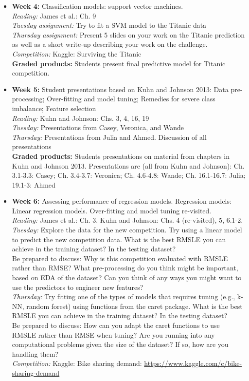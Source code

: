 \documentclass[11pt,oneside]{amsart}
\begin{document}
\begin{itemize}
\item \textbf{Week 4:} Classification models: support vector
  machines.\\
\emph{Reading:} James et al.: Ch. 9\\
\emph{Tuesday assignment:} Try to fit a SVM model to the Titanic data\\
\emph{Thursday assignment:} Present 5 slides on your work on the Titanic prediction as well as a short write-up describing your work on the challenge.\\
\emph{Competition:} Kaggle: Surviving the Titanic\\
\textbf{Graded products:} Students present final predictive model for Titanic
competition.

\item \textbf{Week 5:} Student presentations based on Kuhn and Johnson
  2013: Data pre-processing; Over-fitting and model tuning; Remedies
  for severe class imbalance; Feature selection\\
\emph{Reading:} Kuhn and Johnson: Chs. 3, 4, 16, 19\\
\emph{Tuesday:} Presentations from Casey, Veronica, and Wande\\
\emph{Thursday:} Presentations from Julia and Ahmed. Discussion of all presentations\\
\textbf{Graded products:} Students presentations on material from chapters in Kuhn and
Johnson 2013. Presentations are (all from Kuhn and Johnson): Ch. 3.1-3.3: Casey; Ch. 3.4-3.7: Veronica; Ch. 4.6-4.8: Wande; Ch. 16.1-16.7: Julia; 19.1-3: Ahmed\\

\item \textbf{Week 6:} Assessing performance of regression
  models. Regression models: Linear regression models. Over-fitting
  and model tuning re-visited.\\
\emph{Reading:} James et al.: Ch. 3. Kuhn and Johnson: Chs. 4
(re-visited), 5, 6.1-2.\\
\emph{Tuesday:} Explore the data for the new competition. Try using a linear model to predict the new competition data. What is the best RMSLE you can achieve in the training dataset? In the testing dataset?\\
Be prepared to discuss: Why is this competition evaluated with RMSLE rather than RMSE? What pre-processing do you think might be important, based on EDA of the dataset? Can you think of any ways you might want to use the predictors to engineer new features?\\
\emph{Thursday:} Try fitting one of the types of models that requires tuning (e.g., k-NN, random forest) using functions from the caret package. What is the best RMSLE you can achieve in the training dataset? In the testing dataset?\\ 
Be prepared to discuss: How can you adapt the caret functions to use RMSLE rather than RMSE when tuning? Are you running into any computational problems given the size of the dataset? If so, how are you handling them?\\
\emph{Competition:} Kaggle: Bike sharing demand: \url{https://www.kaggle.com/c/bike-sharing-demand}


\end{itemize}
\end{document}
